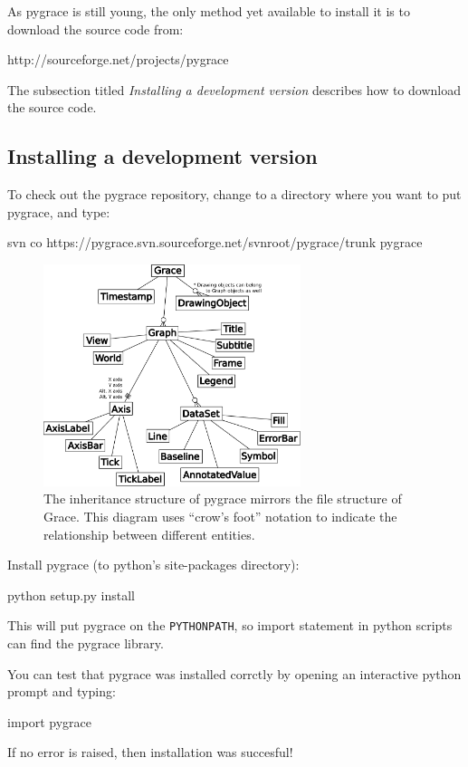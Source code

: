 As pygrace is still young, the only method yet available to install it
is to download the source code from:

\begin{command}
http://sourceforge.net/projects/pygrace
\end{command}

\noindent
The subsection titled \textit{Installing a development version}
describes how to download the source code.

\subsection*{Installing a development version}

\begin{flushleft}

To check out the pygrace repository, change to a directory where you
want to put pygrace, and type:

\begin{command}
svn co https://pygrace.svn.sourceforge.net/svnroot/pygrace/trunk
pygrace
\end{command}

\begin{figure}[t!]
  \centering
  \includegraphics[width=0.67\textwidth]{../Diagrams/crow_diagram.pdf}
  \caption{
%
The inheritance structure of pygrace mirrors the file structure of
Grace.  This diagram uses ``crow's foot'' notation to indicate the
relationship between different entities.
%
  }
  \label{crowdiagram}
\end{figure}

Install pygrace (to python's site-packages directory):

\begin{command}
python setup.py install
\end{command}

This will put pygrace on the {\tt PYTHONPATH}, so import statement
in python scripts can find the pygrace library.

You can test that pygrace was installed corrctly by opening
an interactive python prompt and typing:

\begin{command}
import pygrace
\end{command}

If no error is raised, then installation was succesful!

\end{flushleft}
